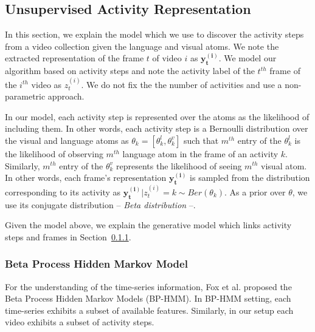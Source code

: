 \subsection{Unsupervised Activity Representation}
\label{basics}
\label{learning}
In this section, we explain the model which we use to discover the activity steps from a video collection given the language and visual atoms. We note the extracted representation of the frame $t$ of video $i$ as $\mathbf{y^{(i)}_t}$. We model our algorithm based on activity steps and note the activity label of the $t^{th}$ frame of the $i^{th}$ video as $z^{(i)}_t$. We do not fix the the number of activities and use a non-parametric approach.


In our model, each activity step is represented over the atoms as the likelihood of including them. In other words, each activity step is a Bernoulli distribution over the visual and language atoms as $\theta_k=[\theta_k^l,\theta_k^v]$ such that $m^{th}$ entry of the $\theta_k^l$ is the likelihood of observing $m^{th}$ language atom in the frame of an activity $k$. Similarly, $m^{th}$ entry of the $\theta_k^v$ represents the likelihood of seeing $m^{th}$ visual atom. In other words, each frame's representation $\mathbf{y^{(i)}_t}$ is sampled from the distribution corresponding to its activity as \mbox{$\mathbf{y^{(i)}_t}|z^{(i)}_t=k \sim Ber(\theta_k)$}. As a prior over $\theta$, we use its conjugate distribution -- \emph{Beta distribution} --.

Given the model above, we explain the generative model which links activity steps and frames in Section~\ref{bphmm}.
\subsubsection{Beta Process Hidden Markov Model}
\label{bphmm}
For the understanding of the time-series information, Fox et al.\cite{foxBPHMM} proposed the Beta Process Hidden Markov Models (BP-HMM). In BP-HMM setting, each time-series exhibits a subset of available features. Similarly, in our setup each video exhibits a subset of activity steps.

